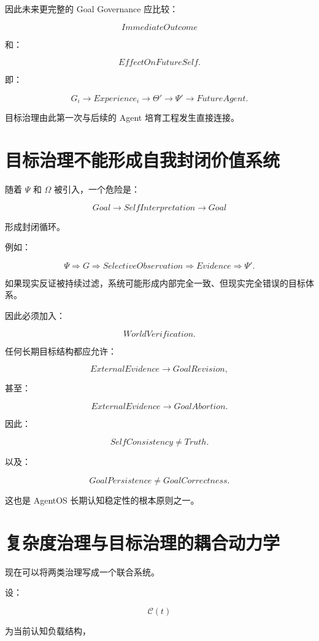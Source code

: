 因此未来更完整的 Goal Governance 应比较：

\[
ImmediateOutcome
\]

和：

\[
EffectOnFutureSelf.
\]

即：

\[
G_i
\rightarrow
Experience_i
\rightarrow
\Theta'
\rightarrow
\Psi'
\rightarrow
FutureAgent.
\]

目标治理由此第一次与后续的 Agent 培育工程发生直接连接。


\section{目标治理不能形成自我封闭价值系统}

随着 $\Psi$ 和 $\Omega$ 被引入，一个危险是：

\[
Goal
\rightarrow
SelfInterpretation
\rightarrow
Goal
\]

形成封闭循环。

例如：

\[
\Psi
\Rightarrow
G
\Rightarrow
SelectiveObservation
\Rightarrow
Evidence
\Rightarrow
\Psi'.
\]

如果现实反证被持续过滤，系统可能形成内部完全一致、但现实完全错误的目标体系。

因此必须加入：

\[
\boxed{
WorldVerification.
}
\]

任何长期目标结构都应允许：

\[
ExternalEvidence
\rightarrow
GoalRevision,
\]

甚至：

\[
ExternalEvidence
\rightarrow
GoalAbortion.
\]

因此：

\[
\boxed{
SelfConsistency
\neq
Truth.
}
\]

以及：

\[
\boxed{
GoalPersistence
\neq
GoalCorrectness.
}
\]

这也是 AgentOS 长期认知稳定性的根本原则之一。


\section{复杂度治理与目标治理的耦合动力学}

现在可以将两类治理写成一个联合系统。

设：

\[
\mathcal C(t)
\]

为当前认知负载结构，

